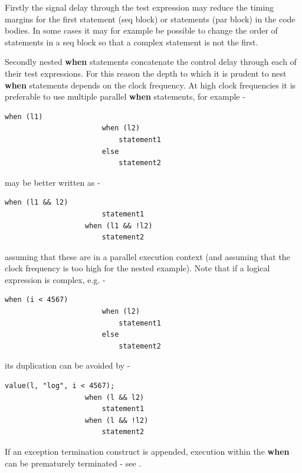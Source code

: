             Firstly the signal delay through the test expression may reduce
            the timing margins for the first statement (seq block) or statements
            (par block) in the code bodies. In some cases it may for example
            be possible to change the order of statements in a seq block so that
            a complex statement is not the first.
            
            Secondly nested {\bf when} statements concatenate the control delay
            through each of their test expressions. For this reason the depth to
            which it is prudent to nest {\bf when} statements depends on the clock
            frequency. At high clock frequencies it is preferable to use multiple
            parallel {\bf when} statements, for example -
            \begin{lstlisting}[gobble=12, language=threepl]
                   when (l1)
                       when (l2)
                           statement1
                       else
                           statement2
            \end{lstlisting}
            may be better written as -
            \begin{lstlisting}[gobble=12, language=threepl]
                   when (l1 && l2)
                       statement1
                   when (l1 && !l2)
                       statement2
            \end{lstlisting}
            assuming that these are in a parallel execution context (and
            assuming that the clock frequency is too high for the nested
            example). Note that if a logical expression is complex, e.g. -
            \begin{lstlisting}[gobble=12, language=threepl]
                   when (i < 4567)
                       when (l2)
                           statement1
                       else
                           statement2
            \end{lstlisting}
            its duplication can be avoided by -
            \begin{lstlisting}[gobble=12, language=threepl]
                   value(l, "log", i < 4567);
                   when (l && l2)
                       statement1
                   when (l && !l2)
                       statement2
            \end{lstlisting}
                    
            If an exception termination construct is appended, execution within
            the {\bf when} can be prematurely terminated
            - see .







